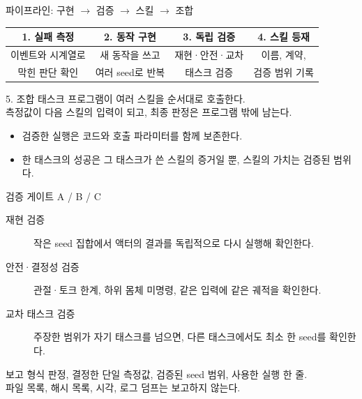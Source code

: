 \documentclass[aspectratio=169,10pt]{beamer}
\begin{document}
\begin{frame}{파이프라인: 구현 $\rightarrow$ 검증 $\rightarrow$ 스킬 $\rightarrow$ 조합}
  \begin{center}
    \small
    \begin{tabular}{@{}c@{\quad$\rightarrow$\quad}c@{\quad$\rightarrow$\quad}c@{\quad$\rightarrow$\quad}c@{}}
      \toprule
      \textbf{1. 실패 측정} & \textbf{2. 동작 구현} & \textbf{3. 독립 검증} & \textbf{4. 스킬 등재} \\
      \midrule
      이벤트와 시계열로 & 새 동작을 쓰고 & 재현·안전·교차 & 이름, 계약, \\
      막힌 판단 확인 & 여러 seed로 반복 & 태스크 검증 & 검증 범위 기록 \\
      \bottomrule
    \end{tabular}
  \end{center}

  \vspace{0.6em}
  \begin{block}{5. 조합}
    태스크 프로그램이 여러 스킬을 순서대로 호출한다.\\
    측정값이 다음 스킬의 입력이 되고, 최종 판정은 프로그램 밖에 남는다.
  \end{block}

  \begin{itemize}
    \item 검증한 실행은 코드와 호출 파라미터를 함께 보존한다.
    \item 한 태스크의 성공은 그 태스크가 쓴 스킬의 증거일 뿐, 스킬의 가치는 검증된 범위다.
  \end{itemize}
\end{frame}

\begin{frame}{검증 게이트 A / B / C}
  \begin{description}
    \item[재현 검증] 작은 seed 집합에서 액터의 결과를 독립적으로 다시 실행해 확인한다.
    \item[안전·결정성 검증] 관절·토크 한계, 하위 몸체 미명령, 같은 입력에 같은 궤적을 확인한다.
    \item[교차 태스크 검증] 주장한 범위가 자기 태스크를 넘으면, 다른 태스크에서도 최소 한 seed를 확인한다.
  \end{description}

  \vspace{0.6em}
  \begin{block}{보고 형식}
    판정, 결정한 단일 측정값, 검증된 seed 범위, 사용한 실행 한 줄.\\
    파일 목록, 해시 목록, 시각, 로그 덤프는 보고하지 않는다.
  \end{block}
\end{frame}
\end{document}

